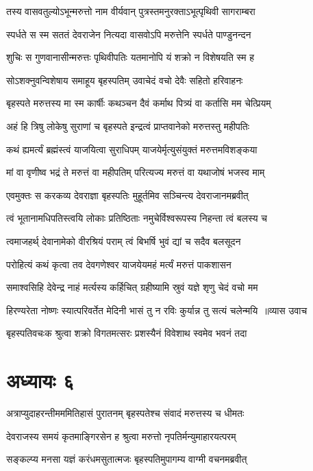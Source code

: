 \twolineshloka
{तस्य वासवतुल्योऽभून्मरुत्तो नाम वीर्यवान्}
{पुत्रस्तमनुरक्ताऽभूत्पृथिवी सागराम्बरा}


\twolineshloka
{स्पर्धते स स्म सततं देवराजेन नित्यदा}
{वासवोऽपि मरुत्तेनि स्पर्धते पाण्डुनन्दन}


\twolineshloka
{शुचिः स गुणवानासीन्मरुत्तः पृथिवीपतिः}
{यतमानोपि यं शक्रो न विशेषयति स्म ह}


\twolineshloka
{सोऽशक्नुवन्विशेषाय समाहूय बृहस्पतिम्}
{उवाचेदं वचो देवैः सहितो हरिवाहनः}


\twolineshloka
{बृहस्पते मरुत्तस्य मा स्म कार्षीः कथञ्चन}
{दैवं कर्माथ पित्र्यं वा कर्तासि मम चेत्प्रियम्}


\twolineshloka
{अहं हि त्रिषु लोकेषु सुराणां च बृहस्पते}
{इन्द्रत्वं प्राप्तवानेको मरुत्तस्तु महीपतिः}


\twolineshloka
{कथं ह्यमर्त्यं ब्रह्मंस्त्वं याजयित्वा सुराधिपम्}
{याजयेर्मृत्युसंयुक्तं मरुत्तमविशङ्कया}


\twolineshloka
{मां वा वृणीष्व भद्रं ते मरुत्तं वा महीपतिम्}
{परित्यज्य मरुत्तं वा यथाजोषं भजस्व माम्}


\twolineshloka
{एवमुक्तः स करकव्य देवराज्ञा बृहस्पतिः}
{मुहूर्तमिव सञ्चिन्त्य देवराजानमब्रवीत्}


\twolineshloka
{त्वं भूतानामधिपतिस्त्वयि लोकाः प्रतिष्ठिताः}
{नमुचेर्विश्वरूपस्य निहन्ता त्वं बलस्य च}


\twolineshloka
{त्वमाजहर्थ् देवानामेको वीरश्रियं पराम्}
{त्वं बिभर्षि भुवं द्यां च सदैव बलसूदन}


\twolineshloka
{परोहित्यं कथं कृत्वा तव देवगणेश्वर}
{याजयेयमहं मर्त्यं मरुत्तं पाकशासन}


\twolineshloka
{समाश्वसिहि देवेन्द्र नाहं मर्त्यस्य कर्हिचित्}
{ग्रहीष्यामि स्रुवं यज्ञे शृणु चेदं वचो मम}


\threelineshloka
{हिरण्यरेता नोष्णः स्यात्परिवर्तेत मेदिनी}
{भासं तु न रविः कुर्यान्न तु सत्यं चलेन्मयि ॥व्यास उवाच}
{}


\twolineshloka
{बृहस्पतिवचःक श्रुत्वा शक्रो विगतमत्सरः}
{प्रशस्यैनं विवेशाथ स्वमेव भवनं तदा}


\chapter{अध्यायः ६}
\twolineshloka
{अत्राप्युदाहरन्तीमममितिहासं पुरातनम्}
{बृहस्पतेश्च संवादं मरुत्तस्य च धीमतः}


\twolineshloka
{देवराजस्य समयं कृतमाङ्गिरसेन ह}
{श्रुत्वा मरुत्तो नृपतिर्मन्युमाहारयत्परम्}


\twolineshloka
{सङ्कल्प्य मनसा यज्ञं करंधमसुतात्मजः}
{बृहस्पतिमुपागम्य वाग्मी वचनमब्रवीत्}


